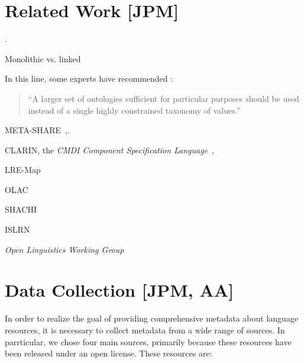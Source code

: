 \documentclass[smallextended]{svjour3}       %
\begin{document}
\section{Related Work [JPM]}
\label{related-work}

\cite{nilsson2010interoperability,khoo2010merging,nogueras2004metadata}. 

Monolithic vs. linked

In this line, some experts have recommended \cite{brooks2006towards}:

\begin{quote}
``A larger set of ontologies sufficient for particular purposes should
be used instead of a single highly constrained taxonomy of values.''
\end{quote}

META-SHARE~\cite{gavrilidou2012meta},\cite{piperidis2012meta}.

CLARIN, the \emph{CMDI Component
Specification Language}~\cite{broeder2012cmdi}, \cite{van2012semantic}

LRE-Map~\cite{calzolari2012lre} 

OLAC \cite{piperidis2012meta}

SHACHI \cite{tohyama2008shachi}

ISLRN \cite{choukri2012using}



\emph{Open Linguistics Working Group}~\cite{chiarcos2012open} 

\section{Data Collection [JPM, AA]}
\label{data-collection}

In order to realize the goal of providing comprehensive metadata about language
resources, it is necessary to collect metadata from a wide range of sources. In
parrticular, we chose four main sources, primarily because these resources have
been released under an open license. These resources are:
\end{document}
